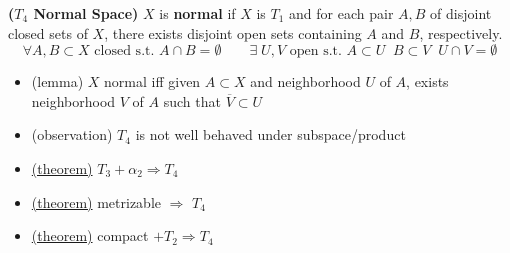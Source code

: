 \documentclass[10.5pt]{article}
\begin{document}
\begin{defn*}
    \textbf{($T_4$ Normal Space)} $X$ is \textbf{normal} if $X$ is $T_1$ and for each pair $A,B$ of disjoint closed sets of $X$, there exists disjoint open sets containing $A$ and $B$, respectively.
    \[
        \forall A,B\subset X \text{ closed s.t. } A\cap B=\emptyset \qquad \exists\; U,V \text{ open s.t. } A\subset U \;\; B\subset V \;\; U\cap V = \emptyset
    \]
    \begin{itemize}
        \item (lemma) $X$ normal iff given $A\subset X$ and neighborhood $U$ of $A$, exists neighborhood $V$ of $A$ such that $\overline{V} \subset U$
        \item (observation) $T_4$ is not well behaved under subspace/product 
        \item \underline{(theorem)} $T_3 + \alpha_2 \Rightarrow T_4$
        \item \underline{(theorem)} metrizable $\Rightarrow$ $T_4$
        \item \underline{(theorem)} compact $+ T_2 \Rightarrow T_4$
    \end{itemize}
\end{defn*}
\end{document}
